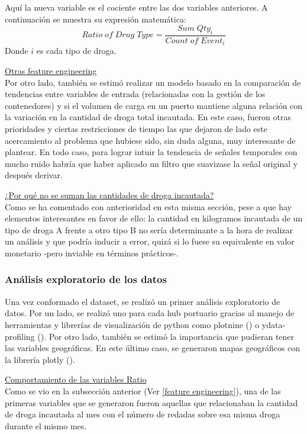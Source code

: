 \documentclass[12pt]{article}
\begin{document}
		Aquí la nueva variable es el cociente entre las dos variables anteriores. A continuación se muestra su expresión matemática: 
		$$
		Ratio\; of\; Drug\; Type = \frac{Sum\; Qty_i}{Count\; of\; Event_i}
		$$
		Donde $i$ es cada tipo de droga.
		
		\underline{Otras feature engineering}\\
		Por otro lado, también se estimó realizar un modelo basado en la comparación de tendencias entre variables de entrada (relacionadas con la gestión de los contenedores) y si el volumen de carga en un puerto mantiene alguna relación con la variación en la cantidad de droga total incautada. En este caso, fueron otras prioridades y ciertas restricciones de tiempo las que dejaron de lado este acercamiento al problema que hubiese sido, sin duda alguna, muy interesante de plantear. En todo caso, para lograr intuir la tendencia de señales temporales con mucho ruido habría que haber aplicado un filtro que suavizase la señal original y después derivar.
		
		\underline{¿Por qué no se suman las cantidades de droga incautada?}\\
		Como se ha comentado con anterioridad en esta misma sección, pese a que hay elementos interesantes en favor de ello: la cantidad en kilogramos incautada de un tipo de droga A frente a otro tipo B no sería determinante a la hora de realizar un análisis y que podría inducir a error, quizá si lo fuese su equivalente en valor monetario -pero inviable en términos prácticos-.
		
		\subsubsection{\label{EDA}Análisis exploratorio de los datos}
		Una vez conformado el dataset, se realizó un primer análisis exploratorio de datos. Por un lado, se realizó uno para cada hub portuario gracias al manejo de herramientas y librerías de visualización de python como plotnine (\cite{plotnine2025}) o ydata-profiling (\cite{ydata2025profiling}). Por otro lado, también se estimó la importancia que pudieran tener las variables geográficas. En este último caso, se generaron mapas geográficos con la librería plotly (\cite{plotly2025python}).
		
		\underline{Comportamiento de las variables Ratio}\\
		Como se vio en la subsección anterior (Ver \ref{feature engineering}), una de las primeras variables que se generaron fueron aquellas que relacionaban la cantidad de droga incautada al mes con el número de redadas sobre esa misma droga durante el mismo mes.
		
\end{document}
